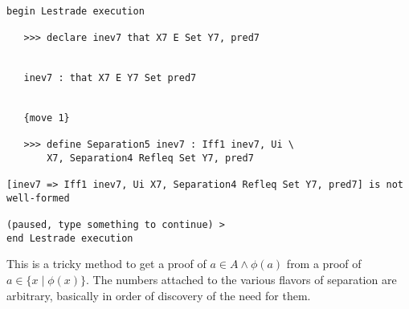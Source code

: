 \documentclass[12pt]{article}
\begin{document}
\begin{verbatim}

begin Lestrade execution

   >>> declare inev7 that X7 E Set Y7, pred7


   inev7 : that X7 E Y7 Set pred7


   {move 1}

   >>> define Separation5 inev7 : Iff1 inev7, Ui \
       X7, Separation4 Refleq Set Y7, pred7

[inev7 => Iff1 inev7, Ui X7, Separation4 Refleq Set Y7, pred7] is not well-formed

(paused, type something to continue) >
end Lestrade execution
\end{verbatim}

This is a tricky method to get a proof of $a \in A \wedge \phi(a)$ from a proof of $a \in \{x \mid \phi(x)\}$.  The numbers attached to the various flavors of separation are arbitrary, basically in order of discovery of the need for them.
\end{document}
